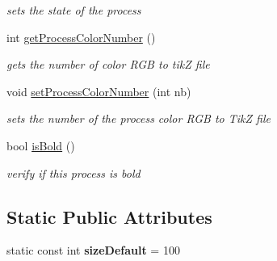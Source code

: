 \begin{DoxyCompactItemize}
\begin{DoxyCompactList}\small\item\em sets the state of the process \end{DoxyCompactList}\item 
\hypertarget{classGProcess_a2258dbe7ac135031d9b86dba9b4412a5}{int \hyperlink{classGProcess_a2258dbe7ac135031d9b86dba9b4412a5}{get\+Process\+Color\+Number} ()}\label{classGProcess_a2258dbe7ac135031d9b86dba9b4412a5}

\begin{DoxyCompactList}\small\item\em gets the number of color R\+G\+B to tik\+Z file \end{DoxyCompactList}\item 
\hypertarget{classGProcess_a7c4daece5e21e153838b0ed26cdf83fe}{void \hyperlink{classGProcess_a7c4daece5e21e153838b0ed26cdf83fe}{set\+Process\+Color\+Number} (int nb)}\label{classGProcess_a7c4daece5e21e153838b0ed26cdf83fe}

\begin{DoxyCompactList}\small\item\em sets the number of the process color R\+G\+B to Tik\+Z file \end{DoxyCompactList}\item 
\hypertarget{classGProcess_a18a028b1a1c4e1b7949e31b2bdb4466a}{bool \hyperlink{classGProcess_a18a028b1a1c4e1b7949e31b2bdb4466a}{is\+Bold} ()}\label{classGProcess_a18a028b1a1c4e1b7949e31b2bdb4466a}

\begin{DoxyCompactList}\small\item\em verify if this process is bold \end{DoxyCompactList}\end{DoxyCompactItemize}
\subsection*{Static Public Attributes}
\begin{DoxyCompactItemize}
\item 
\hypertarget{classGProcess_a54973973fcc0c91f496a3e2504cad5eb}{static const int {\bfseries size\+Default} = 100}\label{classGProcess_a54973973fcc0c91f496a3e2504cad5eb}

\end{DoxyCompactItemize}

